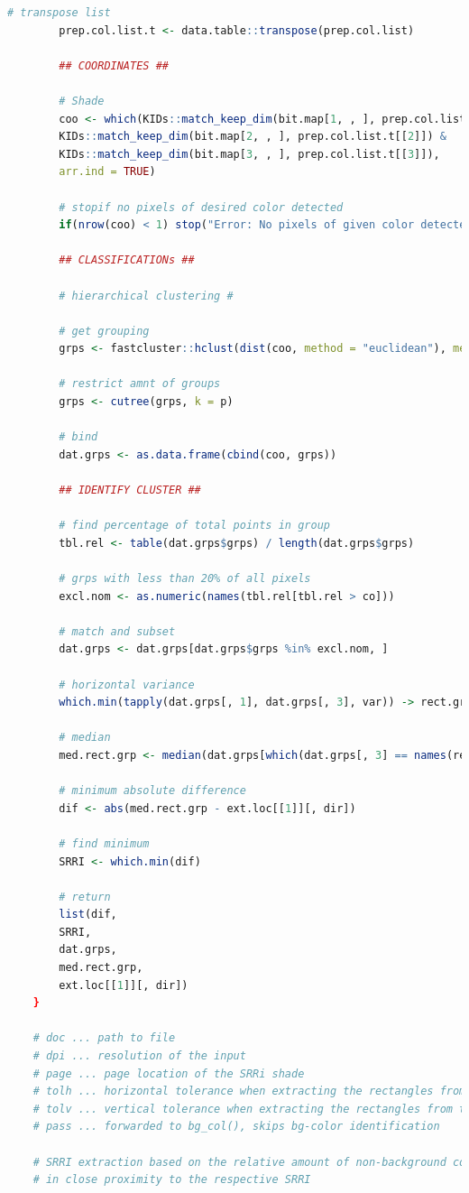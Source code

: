 \documentclass[aodsor,preprint]{imsart}
\numberwithin{equation}{section}
\theoremstyle{plain}
\begin{document}
\begin{lstlisting}[language = R, basicstyle = \tiny]
		# transpose list
		prep.col.list.t <- data.table::transpose(prep.col.list)
		
		## COORDINATES ##
		
		# Shade
		coo <- which(KIDs::match_keep_dim(bit.map[1, , ], prep.col.list.t[[1]]) &
		KIDs::match_keep_dim(bit.map[2, , ], prep.col.list.t[[2]]) &
		KIDs::match_keep_dim(bit.map[3, , ], prep.col.list.t[[3]]),
		arr.ind = TRUE)
		
		# stopif no pixels of desired color detected
		if(nrow(coo) < 1) stop("Error: No pixels of given color detected.")
		
		## CLASSIFICATIONs ##
		
		# hierarchical clustering #
		
		# get grouping
		grps <- fastcluster::hclust(dist(coo, method = "euclidean"), method = method)
		
		# restrict amnt of groups
		grps <- cutree(grps, k = p)
		
		# bind
		dat.grps <- as.data.frame(cbind(coo, grps))
		
		## IDENTIFY CLUSTER ##
		
		# find percentage of total points in group
		tbl.rel <- table(dat.grps$grps) / length(dat.grps$grps)
		
		# grps with less than 20% of all pixels
		excl.nom <- as.numeric(names(tbl.rel[tbl.rel > co]))
		
		# match and subset
		dat.grps <- dat.grps[dat.grps$grps %in% excl.nom, ]
		
		# horizontal variance
		which.min(tapply(dat.grps[, 1], dat.grps[, 3], var)) -> rect.grp
		
		# median
		med.rect.grp <- median(dat.grps[which(dat.grps[, 3] == names(rect.grp)), 1])
		
		# minimum absolute difference
		dif <- abs(med.rect.grp - ext.loc[[1]][, dir])
		
		# find minimum
		SRRI <- which.min(dif)
		
		# return
		list(dif,
		SRRI,
		dat.grps,
		med.rect.grp,
		ext.loc[[1]][, dir])
	}
	
	# doc ... path to file
	# dpi ... resolution of the input
	# page ... page location of the SRRi shade
	# tolh ... horizontal tolerance when extracting the rectangles from the SRRI scale
	# tolv ... vertical tolerance when extracting the rectangles from the SRRI scale
	# pass ... forwarded to bg_col(), skips bg-color identification
	
	# SRRI extraction based on the relative amount of non-background colored pixels
	# in close proximity to the respective SRRI
	

\end{lstlisting}
\end{document}
